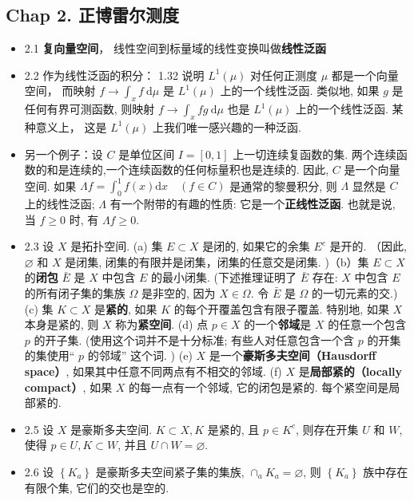 \subsection{Chap 2. 正博雷尔测度}
\begin{itemize}
\item 2.1 \textbf{复向量空间}， 线性空间到标量域的线性变换叫做\textbf{线性泛函}

\item 2.2 作为线性泛函的积分： 1.32 说明 $L^1(\mu)$ 对任何正测度 $\mu$ 都是一个向量空间， 而映射 $f \rightarrow \int_{x} f \mathrm{~d} \mu$ 是 $L^1(\mu)$ 上的一个线性泛函. 类似地, 如果 $g$ 是任何有界可测函数, 则映射 $f \rightarrow \int_{x} f g \mathrm{~d} \mu$ 也是 $L^1(\mu)$ 上的一个线性泛函. 某种意义上， 这是 $L^1(\mu)$ 上我们唯一感兴趣的一种泛函.

\item 另一个例子：设 $C$ 是单位区间 $I=[0,1]$ 上一切连续复函数的集. 两个连续函数的和是连续的,一个连续函数的任何标量积也是连续的. 因此, $C$ 是一个向量空间. 如果 $\Lambda f=\int_{0}^{1} f(x) \mathrm{d} x \quad(f \in C)$ 是通常的黎曼积分, 则 $\Lambda$ 显然是 $C$ 上的线性泛函; $\Lambda$ 有一个附带的有趣的性质: 它是一个\textbf{正线性泛函}. 也就是说, 当 $f \geqslant 0$ 时, 有 $\Lambda f \geqslant 0$.

\item 2.3 设 $X$ 是拓扑空间. (a) 集 $E \subset X$ 是闭的, 如果它的余集 $E^{c}$ 是开的. （因此, $\varnothing$ 和 $X$ 是闭集, 闭集的有限并是闭集，闭集的任意交是闭集. )（b）集 $E \subset X$ 的\textbf{闭包} $\bar{E}$ 是 $X$ 中包含 $E$ 的最小闭集. (下述推理证明了 $\bar{E}$ 存在: $X$ 中包含 $E$ 的所有闭子集的集族 $\Omega$ 是非空的, 因为 $X \in \Omega$. 令 $\bar{E}$ 是 $\Omega$ 的一切元素的交.) (c) 集 $K \subset X$ 是\textbf{紧的}, 如果 $K$ 的每个开覆盖包含有限子覆盖. 特别地, 如果 $X$ 本身是紧的, 则 $X$ 称为\textbf{紧空间}. (d) 点 $p \in X$ 的一个\textbf{邻域}是 $X$ 的任意一个包含 $p$ 的开子集. (使用这个词并不是十分标准; 有些人对任意包含一个含 $p$ 的开集的集使用“ $p$ 的邻域” 这个词. ) (e) $X$ 是一个\textbf{豪斯多夫空间（Hausdorff space）}, 如果其中任意不同两点有不相交的邻域. (f) $X$ 是\textbf{局部紧的（locally compact）}, 如果 $X$ 的每一点有一个邻域, 它的闭包是紧的. 每个紧空间是局部紧的.

\item 2.5 设 $X$ 是豪斯多夫空间. $K \subset X, K$ 是紧的, 且 $p \in K^{c}$, 则存在开集 $U$ 和 $W$, 使得 $p \in U, K \subset W$, 并且 $U \cap W=\varnothing$.

\item 2.6 设 $\left\{K_{a}\right\}$ 是豪斯多夫空间紧子集的集族, $\cap_{a} K_{a}=\varnothing$, 则 $\left\{K_{a}\right\}$ 族中存在有限个集, 它们的交也是空的.


\end{itemize}
